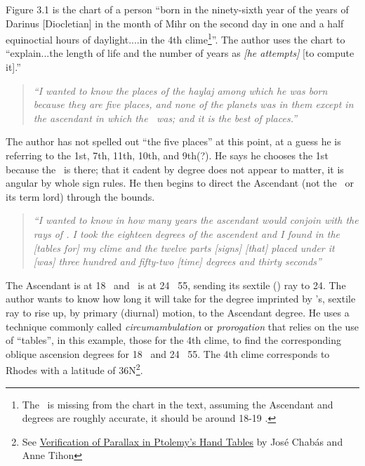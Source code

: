 Figure 3.1 is the chart of a person ``born in the ninety-sixth year of the years of Darinus [Diocletian] in the month of Mihr on the second day in one and a half equinoctial hours of daylight....in the 4th clime\footnote{The \Moon\, is missing from the chart in the text, assuming the Ascendant and \Sun\, degrees are roughly accurate, it should be around 18-19 \Virgo.}''. The author uses the chart to ``explain...the length of life and the number of years as \textsl{[he attempts]} [to compute it].''

\begin{quote}
\textsl{``I  wanted to know the places of the haylaj among which he was born because they are five places, and none of the planets was in them except in the ascendant in which the \Sun\, was; and it is the best of places.''}
\end{quote}

The author has not spelled out ``the five places'' at this point, at a guess he is referring to the 1st, 7th, 11th, 10th, and 9th(?).  He says he chooses the 1st because the \Sun\, is there; that it cadent by degree does not appear to matter, it is angular by whole sign rules. He then begins to direct the Ascendant (not the \Sun\, or its term lord) through the bounds.

\begin{quote}
\textsl{``I wanted to know in how many years the ascendant would conjoin with the rays of \Mars. I took the eighteen degrees of the ascendent and I found in the [tables for] my clime and the twelve parts [signs] [that] placed under it [was] three hundred and fifty-two [time] degrees and thirty seconds''}
\end{quote}

The Ascendant is at 18 \Pisces\, and \Mars\, is at 24 \Taurus\, 55, sending its sextile (\Sextile) ray to 24. The author wants to know how long it will take for the degree imprinted by \Mars's, sextile ray to rise up, by primary (diurnal) motion, to the Ascendant degree. He uses a technique commonly called \textsl{circumambulation} or \textsl{prorogation} that relies on the use of ``tables'', in this example, those for the 4th clime, to find the corresponding oblique ascension degrees for 18 \Pisces\, and 24 \Taurus\, 55. The 4th clime corresponds to Rhodes with a latitude of 36N\footnote{See \href{https://journals.sagepub.com/doi/10.1177/002182869302400105}{Verification of Parallax in Ptolemy's Hand Tables} by José Chabás and Anne Tihon }.

